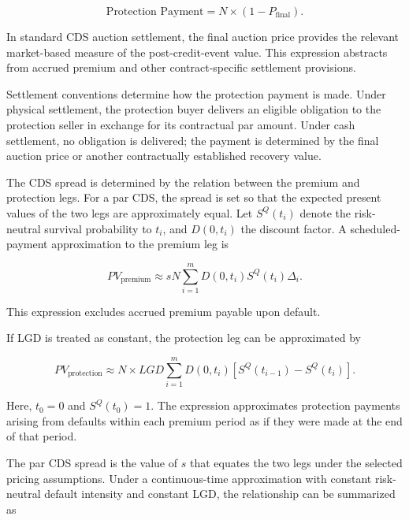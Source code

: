 \begin{equation}
\text{Protection Payment}
=N\times(1-P_{\mathrm{final}}).
\label{eq:ch19-cds-protection-payment}
\end{equation}

In standard CDS auction settlement, the final auction price provides the relevant market-based measure of the post-credit-event value. This expression abstracts from accrued premium and other contract-specific settlement provisions.

Settlement conventions determine how the protection payment is made. Under physical settlement, the protection buyer delivers an eligible obligation to the protection seller in exchange for its contractual par amount. Under cash settlement, no obligation is delivered; the payment is determined by the final auction price or another contractually established recovery value.

The CDS spread is determined by the relation between the premium and protection legs. For a par CDS, the spread is set so that the expected present values of the two legs are approximately equal. Let \(S^Q(t_i)\) denote the risk-neutral survival probability to \(t_i\), and \(D(0,t_i)\) the discount factor. A scheduled-payment approximation to the premium leg is

\begin{equation}
PV_{\mathrm{premium}}
\approx
sN
\sum_{i=1}^{m}
D(0,t_i)S^Q(t_i)\Delta_i.
\label{eq:ch19-cds-premium-leg}
\end{equation}

This expression excludes accrued premium payable upon default.

If LGD is treated as constant, the protection leg can be approximated by

\begin{equation}
PV_{\mathrm{protection}}
\approx
N\times LGD
\sum_{i=1}^{m}
D(0,t_i)
\left[
S^Q(t_{i-1})-S^Q(t_i)
\right].
\label{eq:ch19-cds-protection-leg}
\end{equation}

Here, \(t_0=0\) and \(S^Q(t_0)=1\). The expression approximates protection payments arising from defaults within each premium period as if they were made at the end of that period.

The par CDS spread is the value of \(s\) that equates the two legs under the selected pricing assumptions. Under a continuous-time approximation with constant risk-neutral default intensity and constant LGD, the relationship can be summarized as

